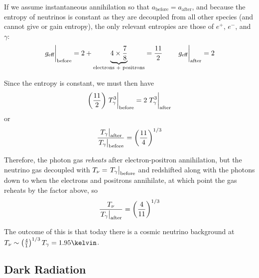 \documentclass[a4paper,twoside,master.tex]{subfiles}
\begin{document}
If we assume instantaneous annihilation so that $ a_{\text{before}} = a_{\text{after}} $, and because the entropy of neutrinos is constant as they are decoupled from all other species (and cannot give or gain entropy), the only relevant entropies are those of $ e^+ $, $ e^- $, and $ \gamma $:
\begin{equation}
    \eval{g_{\text{eff}}}_{\text{before}} = 2 + \underbrace{4 \times \frac{7}{8}}_{\text{electrons + positrons}} = \frac{11}{2} \qquad \eval{g_{\text{eff}}}_{\text{after}} = 2
\end{equation}

Since the entropy is constant, we must then have
\begin{equation}
    \left( \frac{11}{2} \right) \eval{T_{\gamma}^3}_{\text{before}} = 2 \eval{T_{\gamma}^3}_{\text{after}}
\end{equation}
or
\begin{equation}
    \frac{\eval{T_{\gamma}}_{\text{after}}}{\eval{T_{\gamma}}_{\text{before}}} = \left( \frac{11}{4} \right)^{1/3}
\end{equation}

Therefore, the photon gas \textit{reheats} after electron-positron annihilation, but the neutrino gas decoupled with $ T_{\nu} = \eval{T_{\gamma}}_{\text{before}} $ and redshifted along with the photons down to when the electrons and positrons annihilate, at which point the gas reheats by the factor above, so
\begin{equation}
    \frac{T_{\nu}}{\eval{T_{\gamma}}_{\text{after}}} = \left( \frac{4}{11} \right)^{1/3}
\end{equation}

The outcome of this is that today there is a cosmic neutrino background at $ T_{\nu} \sim \left( \frac{4}{1} \right)^{1/3} T_{\gamma} = 1.95\kelvin $.

\subsection{Dark Radiation}\label{sub:dark_radiation}
\end{document}
